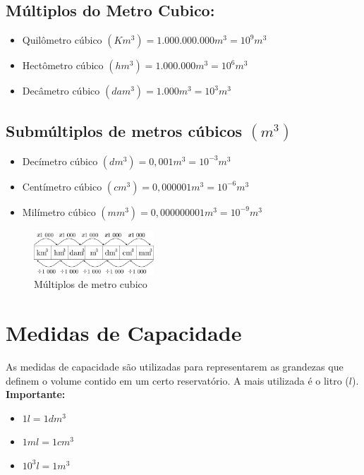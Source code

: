 \subsection{Múltiplos do Metro Cubico:}
		\begin{itemize}
		    \item Quilômetro cúbico $(Km^3) = 1.000.000.000 m^3 = 10^9 m^3$
		    \item Hectômetro cúbico $(hm^3) = 1.000.000 m^3 = 10^6 m^3$
		    \item Decâmetro cúbico $(dam^3) = 1.000 m^3 = 10^3 m^3$
		\end{itemize}
	
\subsection{Submúltiplos de metros cúbicos $(m^3)$}
		\begin{itemize}
		    \item Decímetro cúbico $(dm^3) = 0,001 m^3 = 10^{-3} m^3$
		    \item Centímetro cúbico $(cm^3) = 0,000001 m^3 = 10^{-6} m^3$
		    \item Milímetro cúbico $(mm^3) = 0,000000001 m^3 = 10^{-9} m^3$
		\end{itemize}
		
		\begin{figure}
		    \centering 
            \includegraphics[width=0.4\textwidth]{imagens/matematicaBasica/sistemaDeUnidades/MultiplosDeMetroCubico.pdf}
		    \caption{Múltiplos de metro cubico}
		\end{figure}
     
\section{Medidas de Capacidade}
As medidas de capacidade são utilizadas para representarem
as grandezas que definem o volume contido em um certo
reservatório. A mais utilizada é o litro ($l$).
	\\\textbf{Importante:}
	\begin{itemize}
	    \item $1l = 1dm^3$
	    \item $1 ml = 1 cm^3$
	    \item $10^3 l = 1 m^3$
	\end{itemize}
	
